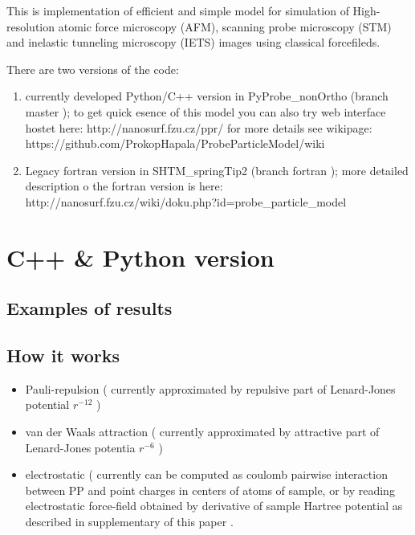 This is implementation of efficient and simple model for simulation of
High-resolution atomic force microscopy (AFM), scanning probe microscopy (STM)
and inelastic tunneling microscopy (IETS) images using classical forcefileds. 

There are two versions of the code:

\begin{enumerate}
   \item currently developed Python/C++ version in PyProbe\_nonOrtho (branch master
    );
        to get quick esence of this model you can also try web interface hostet here: http://nanosurf.fzu.cz/ppr/
        for more details see wikipage:
        https://github.com/ProkopHapala/ProbeParticleModel/wiki
   \item Legacy fortran version in SHTM\_springTip2 (branch fortran );
        more detailed description o the fortran version is here:
        http://nanosurf.fzu.cz/wiki/doku.php?id=probe\_particle\_model 
\end{enumerate}
\cite{phapalamechhighresol}
\cite{phapalaoriginhighresol}


\section{C++ \& Python version}

\subsection{Examples of results}


\subsection{How it works}

\begin{itemize}

    \item  Pauli-repulsion ( currently approximated by repulsive part of
    Lenard-Jones potential $r^{-12}$ )
    \item van der Waals attraction ( currently approximated by attractive part
    of Lenard-Jones potentia $r^{-6}$ )
    \item electrostatic ( currently can be computed as coulomb pairwise
    interaction between PP and point charges in centers of atoms of sample, or
    by reading electrostatic force-field obtained by derivative of sample
    Hartree potential as described in supplementary of this paper
    \cite{phapalaoriginhighresol}.

\end{itemize}

